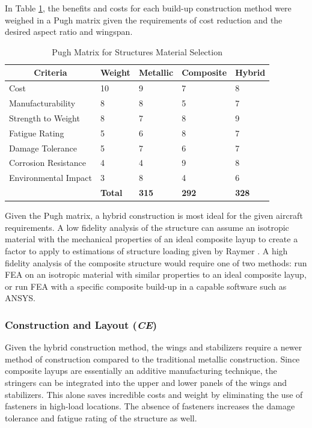 \FloatBarrier
In Table \ref{tab:pugh_structures}, the benefits and costs for each build-up construction method were weighed in a Pugh matrix given the requirements of cost reduction and the desired aspect ratio and wingspan.

\begin{table}[!h]
\centering
\caption{Pugh Matrix for Structures Material Selection}
\begin{tabular}{|p{3.5cm}||p{2cm}|p{2cm}|p{2cm}|p{2cm}| }
\toprule
\multicolumn{1}{|c||}{\textbf{Criteria}} & \multicolumn{1}{c|}{\textbf{Weight}} &  
\multicolumn{1}{c|}{\textbf{Metallic}} & \multicolumn{1}{c|}{\textbf{Composite}} & \multicolumn{1}{c|}{\textbf{Hybrid}} \\ \hline \hline 
Cost & 10 & 9 & 7 & 8 \\ \hline
Manufacturability & 8 & 8 & 5 & 7 \\  \hline
Strength to Weight & 8 & 7 & 8 & 9 \\  \hline
Fatigue Rating & 5 & 6 & 8 & 7 \\  \hline
Damage Tolerance & 5 & 7 & 6 & 7 \\  \hline
Corrosion Resistance & 4 & 4 & 9 & 8 \\  \hline
Environmental Impact & 3 & 8 & 4 & 6 \\  \hline \hline
 & \textbf{Total} & \textbf{315} & \textbf{292} & \textbf{328} \\
\bottomrule
\end{tabular}
\label{tab:pugh_structures}
\end{table}
\FloatBarrier

Given the Pugh matrix, a hybrid construction is most ideal for the given aircraft requirements. A low fidelity analysis of the structure can assume an isotropic material with the mechanical properties of an ideal composite layup to create a factor to apply to estimations of structure loading given by Raymer \cite{raymer}. A high fidelity analysis of the composite structure would require one of two methods: run FEA on an isotropic material with similar properties to an ideal composite layup, or run FEA with a specific composite build-up in a capable software such as ANSYS.

\subsubsection{Construction and Layout (\textit{CE})}
Given the hybrid construction method, the wings and stabilizers require a newer method of construction compared to the traditional metallic construction. Since composite layups are essentially an additive manufacturing technique, the stringers can be integrated into the upper and lower panels of the wings and stabilizers. This alone saves incredible costs and weight by eliminating the use of fasteners in high-load locations. The absence of fasteners increases the damage tolerance and fatigue rating of the structure as well.


